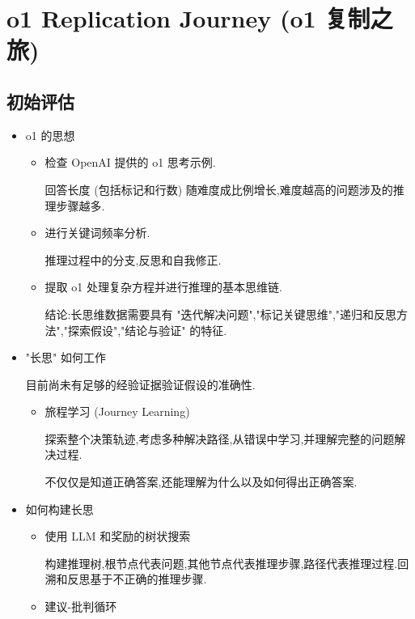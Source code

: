 
\usepackage{../../lectures_preamble}


    \section{o1 Replication Journey (o1 复制之旅)}
    \subsection{初始评估}
    \begin{itemize}
        \item o1 的思想
            \begin{itemize}
                \item  检查 OpenAI 提供的 o1 思考示例.

                    回答长度 (包括标记和行数) 随难度成比例增长,难度越高的问题涉及的推理步骤越多.

                \item 进行关键词频率分析.

                    推理过程中的分支,反思和自我修正.

                \item 提取 o1 处理复杂方程并进行推理的基本思维链.

                    结论:长思维数据需要具有 "迭代解决问题","标记关键思维","递归和反思方法","探索假设","结论与验证" 的特征.
            \end{itemize}
        \item "长思" 如何工作

            目前尚未有足够的经验证据验证假设的准确性.
            \begin{itemize}
                \item 旅程学习 (Journey Learning)

                    探索整个决策轨迹,考虑多种解决路径,从错误中学习,并理解完整的问题解决过程.
                    
                    不仅仅是知道正确答案,还能理解为什么以及如何得出正确答案.
            \end{itemize}
        \item 如何构建长思
            \begin{itemize}
                \item 使用 LLM 和奖励的树状搜索
                    
                    构建推理树,根节点代表问题,其他节点代表推理步骤,路径代表推理过程.回溯和反思基于不正确的推理步骤.
                \item 建议-批判循环


\end{itemize}
\end{itemize}
